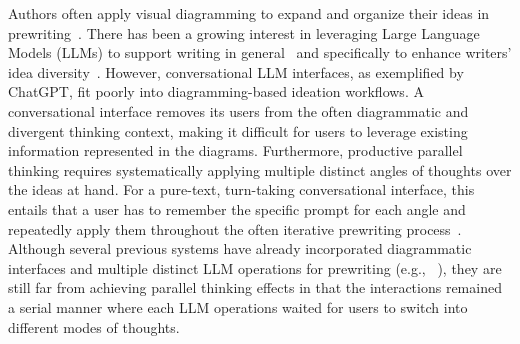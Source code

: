 Authors often apply visual diagramming to expand and organize their ideas in prewriting~\cite{mogahed2013planning}.
There has been a growing interest in leveraging Large Language Models (LLMs) to support writing in general~\cite{chung2022talebrush,clark2018creative,zhang2023visar,suh2023sensecape} and specifically to enhance writers' idea diversity~\cite{benharrak2024writer, shaer2024ai}.
However, conversational LLM interfaces, as exemplified by ChatGPT, fit poorly into diagramming-based ideation workflows.
A conversational interface removes its users from the often diagrammatic and divergent thinking context, making it difficult for users to leverage existing information represented in the diagrams.
Furthermore, productive parallel thinking requires systematically applying multiple distinct angles of thoughts over the ideas at hand. 
For a pure-text, turn-taking conversational interface, this entails that a user has to remember the specific prompt for each angle and repeatedly apply them throughout the often iterative prewriting process~\cite{rohman1965pre}.
Although several previous systems have already incorporated diagrammatic interfaces and multiple distinct LLM operations for prewriting (e.g., ~\cite{lu2018inkplanner,zhang2023visar,suh2023sensecape}), they are still far from achieving parallel thinking effects in that the interactions remained a serial manner where each LLM operations waited for users to switch into different modes of thoughts.

